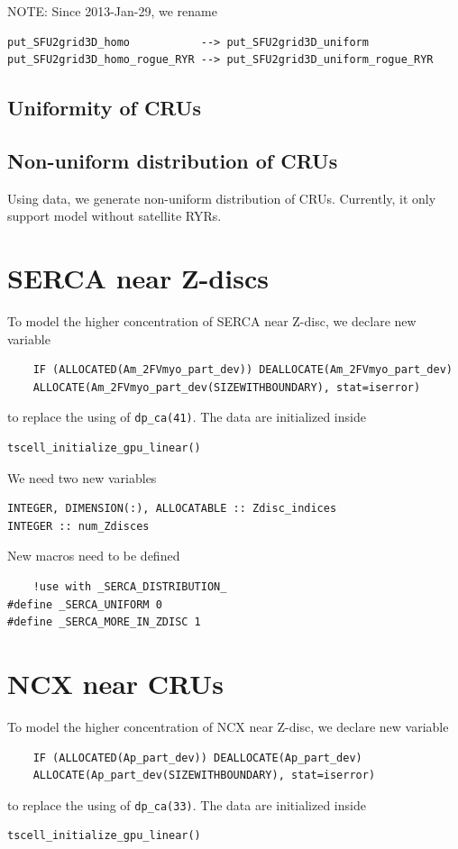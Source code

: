 NOTE: Since 2013-Jan-29, we rename
\begin{verbatim}
put_SFU2grid3D_homo           --> put_SFU2grid3D_uniform
put_SFU2grid3D_homo_rogue_RYR --> put_SFU2grid3D_uniform_rogue_RYR
\end{verbatim}

\subsection{Uniformity of CRUs}



\subsection{Non-uniform distribution of CRUs}

Using \citep{izu2006irr} data, we generate non-uniform distribution of CRUs.
Currently, it only support model without satellite RYRs.


\section{SERCA near Z-discs}

To model the higher concentration of SERCA near Z-disc, we declare new variable
\begin{verbatim}
    IF (ALLOCATED(Am_2FVmyo_part_dev)) DEALLOCATE(Am_2FVmyo_part_dev)
    ALLOCATE(Am_2FVmyo_part_dev(SIZEWITHBOUNDARY), stat=iserror)
\end{verbatim}
to replace the using of \verb!dp_ca(41)!. The data are initialized inside
\begin{verbatim}
tscell_initialize_gpu_linear()
\end{verbatim}

We need two new variables
\begin{verbatim}
INTEGER, DIMENSION(:), ALLOCATABLE :: Zdisc_indices
INTEGER :: num_Zdisces
\end{verbatim}

New macros need to be defined
\begin{verbatim}
    !use with _SERCA_DISTRIBUTION_
#define _SERCA_UNIFORM 0
#define _SERCA_MORE_IN_ZDISC 1
\end{verbatim}

\section{NCX near CRUs}

To model the higher concentration of NCX near Z-disc, we declare new variable
\begin{verbatim}
    IF (ALLOCATED(Ap_part_dev)) DEALLOCATE(Ap_part_dev)
    ALLOCATE(Ap_part_dev(SIZEWITHBOUNDARY), stat=iserror)
\end{verbatim}
to replace the using of \verb!dp_ca(33)!. The data are initialized inside
\begin{verbatim}
tscell_initialize_gpu_linear()
\end{verbatim}

